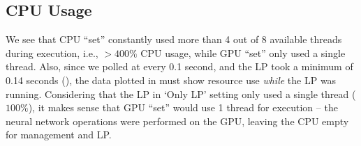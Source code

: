 \subsection{CPU Usage}
We see that CPU ``set'' constantly used more than 4 out of 8 available threads during execution, i.e., $>400\%$ CPU usage, while GPU ``set'' only used a single thread. Also, since we polled at every 0.1 second, and the LP took a minimum of 0.14 seconds (), the data plotted in  must show resource use \textit{while} the LP was running. Considering that the LP in `Only LP' setting only used a single thread ($100\%$), it makes sense that GPU ``set'' would use 1 thread for execution -- the neural network operations were performed on the GPU, leaving the CPU empty for management and LP. 

